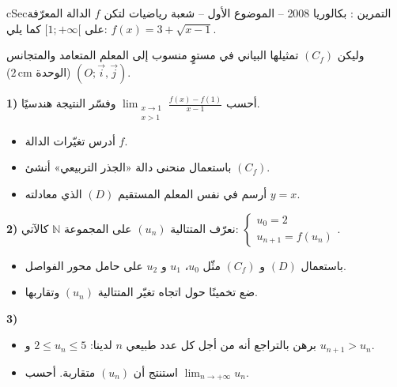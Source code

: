 \documentclass[12pt,a4paper]{article}
\newenvironment{BOX}[2]{\begin{otherlanguage}{english}\begin{arbox}{#1}{#2}}{\end{arbox}\end{otherlanguage}}
\newcounter{exo}
\newenvironment{tamrin}[1]{\stepcounter{exo}\begin{BOX}{cSec}{التمرين \theexo: #1}}{\end{BOX}}
\newcommand{\N}{\mathbb{N}}
\newcommand{\limn}{\displaystyle\lim_{n\to+\infty}}
\newenvironment{sq}{\begin{itemize}[leftmargin=2.4em,itemsep=3pt]}{\end{itemize}}
\newcommand{\qa}{\item[(أ)]}\newcommand{\qb}{\item[(ب)]}\newcommand{\qc}{\item[(جـ)]}\newcommand{\qd}{\item[(د)]}\newcommand{\qe}{\item[(هـ)]}
\begin{document}
\begin{tamrin}{بكالوريا 2008 -- الموضوع الأول -- شعبة رياضيات}
لتكن $f$ الدالة المعرّفة على $[1;+\infty[$ كما يلي: $f(x)=3+\sqrt{x-1}$.

وليكن $(C_f)$ تمثيلها البياني في مستوٍ منسوب إلى المعلم المتعامد والمتجانس $(O;\vec{i},\vec{j})$ (الوحدة $2\,\text{cm}$).

\textbf{1)} أحسب $\displaystyle\lim_{\substack{x\to1\\x>1}}\frac{f(x)-f(1)}{x-1}$ وفسّر النتيجة هندسيًا.
\begin{itemize}
\item أدرس تغيّرات الدالة $f$.
\item باستعمال منحنى دالة «الجذر التربيعي» أنشئ $(C_f)$.
\item أرسم في نفس المعلم المستقيم $(D)$ الذي معادلته $y=x$.
\end{itemize}
\textbf{2)} نعرّف المتتالية $(u_n)$ على المجموعة $\N$ كالآتي: $\begin{cases}u_0=2\\u_{n+1}=f(u_n)\end{cases}$.
\begin{sq}
\qa باستعمال $(D)$ و $(C_f)$ مثّل $u_0$، $u_1$ و $u_2$ على حامل محور الفواصل.
\qb ضع تخمينًا حول اتجاه تغيّر المتتالية $(u_n)$ وتقاربها.
\end{sq}
\textbf{3)}
\begin{sq}
\qa برهن بالتراجع أنه من أجل كل عدد طبيعي $n$ لدينا: $2\leqslant u_n\leqslant5$ و $u_{n+1}>u_n$.
\qb استنتج أن $(u_n)$ متقاربة. أحسب $\limn u_n$.
\end{sq}
\end{tamrin}
\end{document}
